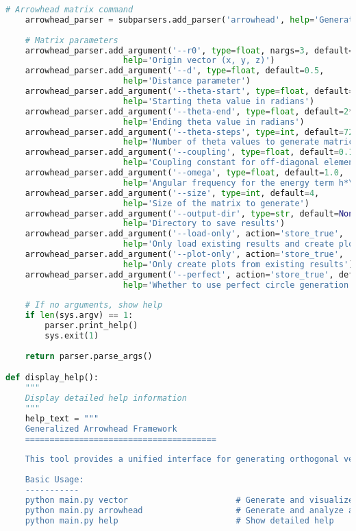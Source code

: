 \begin{lstlisting}[language=Python]
    # Arrowhead matrix command
    arrowhead_parser = subparsers.add_parser('arrowhead', help='Generate and analyze arrowhead matrices')
    
    # Matrix parameters
    arrowhead_parser.add_argument('--r0', type=float, nargs=3, default=[0, 0, 0],
                        help='Origin vector (x, y, z)')
    arrowhead_parser.add_argument('--d', type=float, default=0.5,
                        help='Distance parameter')
    arrowhead_parser.add_argument('--theta-start', type=float, default=0,
                        help='Starting theta value in radians')
    arrowhead_parser.add_argument('--theta-end', type=float, default=2*np.pi,
                        help='Ending theta value in radians')
    arrowhead_parser.add_argument('--theta-steps', type=int, default=72,
                        help='Number of theta values to generate matrices for')
    arrowhead_parser.add_argument('--coupling', type=float, default=0.1,
                        help='Coupling constant for off-diagonal elements')
    arrowhead_parser.add_argument('--omega', type=float, default=1.0,
                        help='Angular frequency for the energy term h*\\omega')
    arrowhead_parser.add_argument('--size', type=int, default=4,
                        help='Size of the matrix to generate')
    arrowhead_parser.add_argument('--output-dir', type=str, default=None,
                        help='Directory to save results')
    arrowhead_parser.add_argument('--load-only', action='store_true',
                        help='Only load existing results and create plots')
    arrowhead_parser.add_argument('--plot-only', action='store_true',
                        help='Only create plots from existing results')
    arrowhead_parser.add_argument('--perfect', action='store_true', default=True,
                        help='Whether to use perfect circle generation method')
    
    # If no arguments, show help
    if len(sys.argv) == 1:
        parser.print_help()
        sys.exit(1)
    
    return parser.parse_args()

def display_help():
    """
    Display detailed help information
    """
    help_text = """
    Generalized Arrowhead Framework
    =======================================
    
    This tool provides a unified interface for generating orthogonal vectors and arrowhead matrices.
    
    Basic Usage:
    -----------
    python main.py vector                      # Generate and visualize orthogonal vectors
    python main.py arrowhead                   # Generate and analyze arrowhead matrices
    python main.py help                        # Show detailed help
    

\end{lstlisting}
